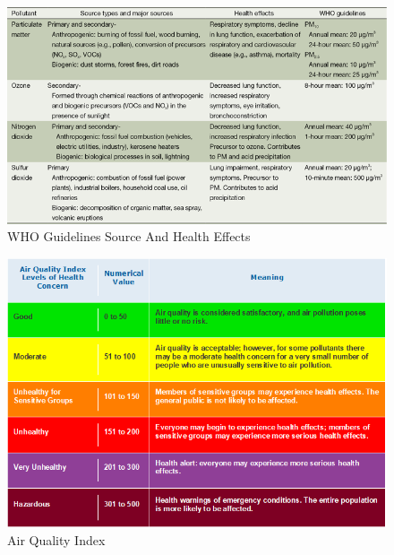 \documentclass[sigconf]{acmart}
\begin{document}
\begin{figure}[htb]
\includegraphics[width=1.0\columnwidth]{images/sourceandhealtheffects.png}
  \caption{WHO Guidelines Source And Health Effects \cite{guidelines}}
  \label{WHOGuidelines}
\end{figure}

\begin{figure}[htb]
\includegraphics[width=1.0\columnwidth]{images/aqiclassification.png}
  \caption{Air Quality Index \cite{airnow-gov}}
  \label{AQI}
\end{figure}
\end{document}
